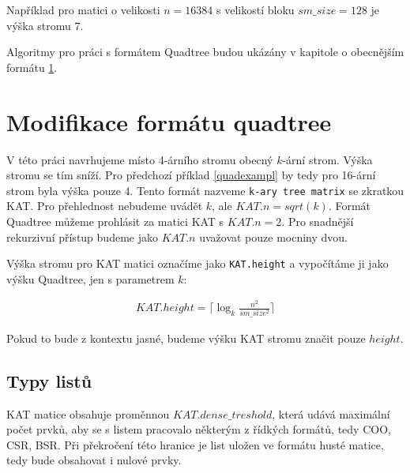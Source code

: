 \label{quadexampl}
Například pro matici o velikosti $n=16384$ s velikostí bloku $sm\_size=128$ je výška stromu $7$.

Algoritmy pro práci s formátem Quadtree budou ukázány v kapitole o obecnějším formátu \ref{katchapter}.


\section{Modifikace formátu quadtree}
\label{katchapter}

V této práci navrhujeme místo 4-árního stromu obecný $k$-ární strom. Výška stromu se tím sníží. Pro předchozí příklad \ref{quadexampl} by tedy pro 16-ární strom byla výška pouze $4$. Tento formát nazveme \texttt{k-ary tree matrix} se zkratkou KAT. Pro přehlednost nebudeme uvádět $k$, ale $KAT.n = sqrt(k)$. Formát Quadtree můžeme prohlásit za matici KAT s $KAT.n = 2$. Pro snadnější rekurzivní přístup budeme jako $KAT.n$ uvažovat pouze mocniny dvou.

Výška stromu pro KAT matici označíme jako \texttt{KAT.height} a vypočítáme ji jako výšku Quadtree, jen s parametrem $k$:

\label{katheight}
\begin{align}
KAT.height = \Bigg\lceil\log_{k}\frac{n^2}{sm\_size^2}\Bigg\rceil
\end{align}

Pokud to bude z kontextu jasné, budeme výšku KAT stromu značit pouze $height$.


\subsection{Typy listů}

KAT matice obsahuje proměnnou $KAT.dense\_treshold$, která udává maximální počet prvků, aby se s listem pracovalo některým z řídkých formátů, tedy COO, CSR, BSR. Při překročení této hranice je list uložen ve formátu husté matice, tedy bude obsahovat i nulové prvky.


